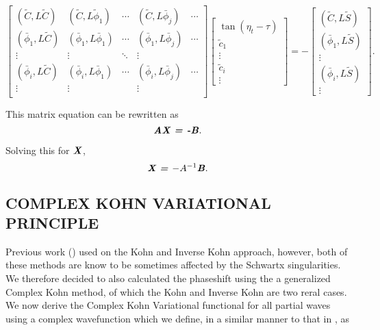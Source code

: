 \documentclass[preprint,showpacs,preprintnumbers,amsmath,amssymb]{revtex4}
\newcommand{\beq}{\begin{equation}}
\newcommand{\eeq}{\end{equation}}
\begin{document}
\begin{equation}
\label{eq:GenKohnMatrix}
\begin{bmatrix} 
 (\tilde{C},L\tilde{C}) & (\tilde{C},L\tilde{\phi}_1) & \cdots & (\tilde{C},L\bar{\phi}_j) & \cdots\\
 (\bar{\phi}_1,L\tilde{C}) & (\bar{\phi}_1,L\bar{\phi}_1) & \cdots & (\bar{\phi}_1,L\bar{\phi}_j) & \cdots\\
 \vdots & \vdots & \ddots & \vdots \\
 (\bar{\phi}_i,L\tilde{C}) & (\bar{\phi}_i,L\bar{\phi}_1) & \cdots & (\bar{\phi}_i,L\bar{\phi}_j) & \cdots\\
 \vdots & \vdots & & \vdots & \\
\end{bmatrix}
\begin{bmatrix}
{\tan(\eta_t- \tau)}\\
\tilde{c}_1\\
\vdots\\
\tilde{c}_i\\
\vdots
\end{bmatrix}
= -
\begin{bmatrix}
(\tilde{C},L\tilde{S}) \\
(\bar{\phi}_1,L\tilde{S}) \\
\vdots \\
(\bar{\phi}_i,L\tilde{S}) \\
\vdots
\end{bmatrix}.
\end{equation}

\noindent This matrix equation can be rewritten as
\beq
\textbf{\emph{AX = -B}}.
\eeq

\noindent Solving this for $\textbf{\emph{X}}$,
\beq
\textbf{\emph{X = $-A^{-1}$B}}.
\eeq


\subsection{COMPLEX KOHN VARIATIONAL PRINCIPLE}









Previous work () used on the Kohn and Inverse Kohn approach, however, both of these methods are know to be sometimes affected by the Schwartx singularities. We therefore decided to also calculated the phaseshift using the a generalized  Complex Kohn method, of which the Kohn and Inverse Kohn are two reral cases.
We now derive the Complex Kohn Variational functional for all partial waves using a complex wavefunction which we define, in a similar manner to that in  \cite{Cooper2010}, as 
\end{document}
